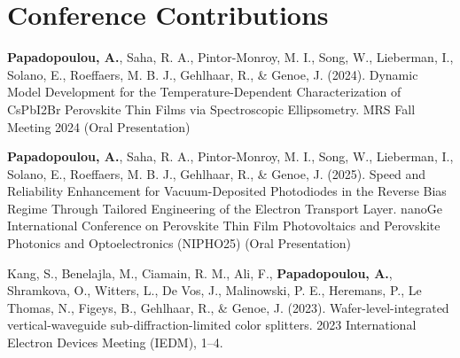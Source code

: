 \section*{Conference Contributions}

\textbf{Papadopoulou, A.}, Saha, R. A., Pintor-Monroy, M. I., Song, W., Lieberman, I., Solano, E., Roeffaers, M. B. J., Gehlhaar, R., \& Genoe, J. (2024). Dynamic Model Development for the Temperature-Dependent Characterization of CsPbI2Br Perovskite Thin Films via Spectroscopic Ellipsometry. MRS Fall Meeting 2024 (Oral Presentation)

\textbf{Papadopoulou, A.}, Saha, R. A., Pintor-Monroy, M. I., Song, W., Lieberman, I., Solano, E., Roeffaers, M. B. J., Gehlhaar, R., \& Genoe, J. (2025). Speed and Reliability Enhancement for Vacuum-Deposited  Photodiodes in the Reverse Bias Regime Through Tailored Engineering of the Electron Transport Layer. nanoGe International Conference on Perovskite Thin Film Photovoltaics and Perovskite Photonics and Optoelectronics (NIPHO25) (Oral Presentation)

Kang, S., Benelajla, M., Ciamain, R. M., Ali, F., \textbf{Papadopoulou, A.}, Shramkova, O., Witters, L., De Vos, J., Malinowski, P. E., Heremans, P., Le Thomas, N., Figeys, B., Gehlhaar, R., \& Genoe, J. (2023). Wafer-level-integrated vertical-waveguide sub-diffraction-limited color splitters. 2023 International Electron Devices Meeting (IEDM), 1–4.



\cleardoublepage

